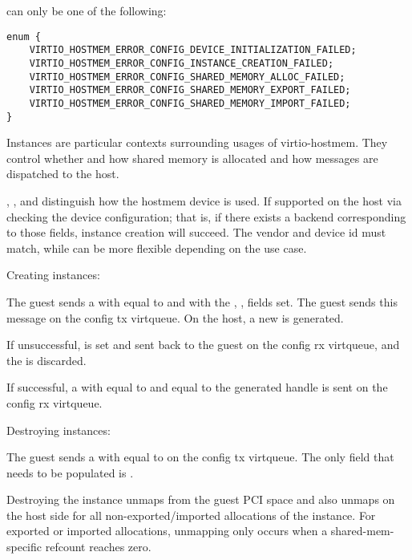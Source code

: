  can only be one of the following:

\begin{lstlisting}
enum {
    VIRTIO_HOSTMEM_ERROR_CONFIG_DEVICE_INITIALIZATION_FAILED;
    VIRTIO_HOSTMEM_ERROR_CONFIG_INSTANCE_CREATION_FAILED;
    VIRTIO_HOSTMEM_ERROR_CONFIG_SHARED_MEMORY_ALLOC_FAILED;
    VIRTIO_HOSTMEM_ERROR_CONFIG_SHARED_MEMORY_EXPORT_FAILED;
    VIRTIO_HOSTMEM_ERROR_CONFIG_SHARED_MEMORY_IMPORT_FAILED;
}
\end{lstlisting}

Instances are particular contexts surrounding usages of virtio-hostmem.
They control whether and how shared memory is allocated
and how messages are dispatched to the host.

, , and 
distinguish how the hostmem device is used.
If supported on the host via checking the device configuration;
that is, if there exists a backend corresponding to those fields,
instance creation will succeed.
The vendor and device id must match,
while  can be more flexible depending on the use case.

Creating instances:

The guest sends a 
with  equal to 
and with the , ,  fields set.
The guest sends this message on the config tx virtqueue.
On the host, a new  is generated.

If unsuccessful,  is set and sent back to the guest
on the config rx virtqueue, and the  is discarded.

If successful, a 
with  equal to 
and  equal to the generated handle
is sent on the config rx virtqueue.

Destroying instances:

The guest sends a 
with  equal to 
on the config tx virtqueue.
The only field that needs to be populated
is .

Destroying the instance unmaps from the guest PCI space
and also unmaps on the host side
for all non-exported/imported allocations of the instance.
For exported or imported allocations, unmapping
only occurs when a shared-mem-specific refcount reaches zero.

